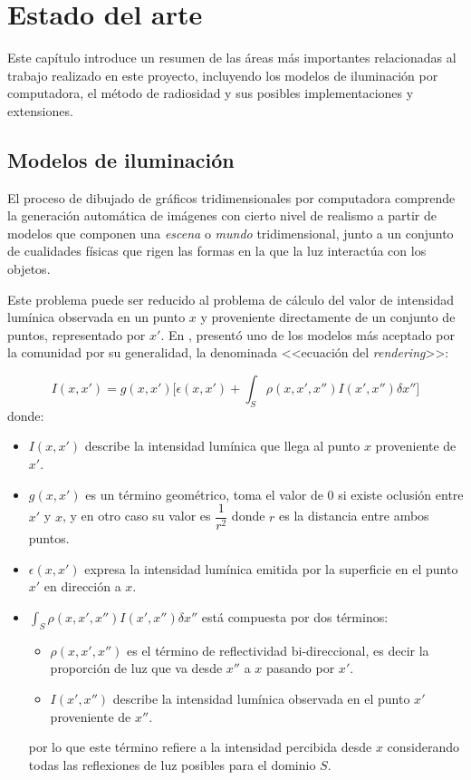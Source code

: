 \chapter{Estado del arte}
\label{ch:chap02}

Este capítulo introduce un resumen de las áreas más importantes relacionadas al trabajo realizado en este proyecto, incluyendo los modelos de iluminación por computadora, el método de radiosidad y sus posibles implementaciones y extensiones.

\section{Modelos de iluminación}
\label{sec:dibujado}

El proceso de dibujado de gráficos tridimensionales por computadora comprende la generación automática de imágenes con cierto nivel de realismo a partir de modelos que componen una \textit{escena} o \textit{mundo} tridimensional, junto a un conjunto de cualidades físicas que rigen las formas en la que la luz interactúa con los objetos.

Este problema puede ser reducido al problema de cálculo del valor de intensidad lumínica observada en un punto $x$ y proveniente directamente de un conjunto de puntos, representado por $x'$. En  \citeyear{Kajiya}, \citeauthor{Kajiya} presentó uno de los modelos más aceptado por la comunidad por su generalidad, la denominada <<ecuación del \textit{rendering}>>:

\begin{equation}
    I(x,x') = g(x,x') \bigg[\epsilon(x,x') + \int_{S} \rho(x,x',x'')I(x',x'') \delta x''\bigg] \label{eq:rendering}
\end{equation}
donde:
\begin{itemize}
    \item $I(x,x')$ describe la intensidad lumínica que llega al punto $x$ proveniente de $x'$.
    \item $g(x,x')$ es un término geométrico, toma el valor de $0$ si existe oclusión entre $x'$ y $x$, y en otro caso su valor es $\dfrac{1}{r^{2}}$ donde $r$ es la distancia entre ambos puntos.
    \item $\epsilon(x,x')$ expresa la intensidad lumínica emitida por la superficie en el punto $x'$ en dirección a $x$.
    \item $\int_{S} \rho(x,x',x'')I(x',x'') \delta x''$ está compuesta por dos términos:
        \begin{itemize}
            \item $\rho(x,x',x'')$ es el término de reflectividad bi-direccional, es decir la proporción de luz que va desde $x''$ a $x$ pasando por $x'$.
            \item $I(x',x'')$ describe la intensidad lumínica observada en el punto $x'$ proveniente de $x''$.
        \end{itemize}
    por lo que este término refiere a la intensidad percibida desde $x$ considerando todas las reflexiones de
    luz posibles para el dominio $S$.
\end{itemize}

